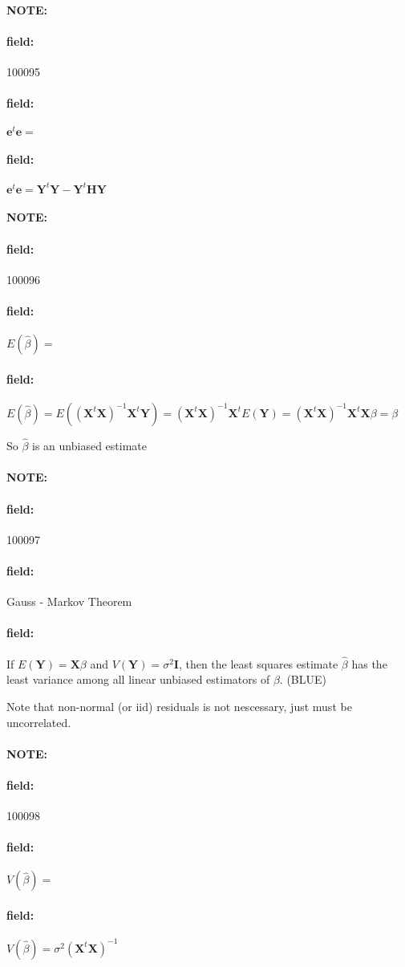 \documentclass[12pt]{article}
\newenvironment{note}{\paragraph{NOTE:}}{}
\newenvironment{field}{\paragraph{field:}}{}
\begin{document}
\begin{note} \begin{field} \tiny 100095 \end{field}
 \begin{field}
  $\mathbf{e}^t \mathbf{e} = $
 \end{field}
 \begin{field}
  $\mathbf{e}^t \mathbf{e} = \mathbf{Y}^t \mathbf{Y} - \mathbf{Y}^t \mathbf{HY}$
 \end{field}
\end{note}


\begin{note} \begin{field} \tiny 100096 \end{field}
 \begin{field}
  $E(\hat{\beta}) = $
 \end{field}
 \begin{field}
  $E(\hat{\beta}) = E((\mathbf{X}^t \mathbf{X})^{-1} \mathbf{X}^t \mathbf{Y}) = (\mathbf{X}^t \mathbf{X})^{-1} \mathbf{X}^t E(\mathbf{Y}) = (\mathbf{X}^t \mathbf{X})^{-1} \mathbf{X}^t \mathbf{X}\beta  = \beta$

  So $\hat{\beta}$ is an unbiased estimate
 \end{field}
\end{note}



\begin{note} \begin{field} \tiny 100097 \end{field}
 \begin{field}
  Gauss - Markov Theorem
 \end{field}
 \begin{field}
  If $E(\mathbf{Y}) = \mathbf{X}\beta$ and $V(\mathbf{Y}) = \sigma^2 \mathbf{I}$, then the least squares estimate $\hat{\beta}$ has the least variance among all linear unbiased estimators of $\beta$. (BLUE)

  Note that non-normal (or iid) residuals is not nescessary, just must be uncorrelated.
 \end{field}
\end{note}



\begin{note} \begin{field} \tiny 100098 \end{field}
 \begin{field}
  $V(\hat{\beta}) = $
 \end{field}
 \begin{field}
  $V(\hat{\beta}) = \sigma^2 (\mathbf{X}^t \mathbf{X})^{-1}$
 \end{field}
\end{note}
\end{document}
